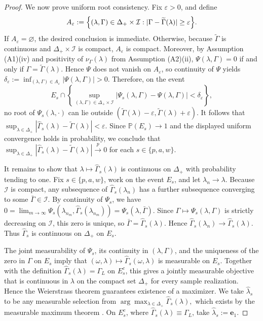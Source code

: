 \documentclass[12pt,leqno,titlepage]{amsart}
\newcommand{\1}{\mathbbm{1}}
\begin{document}
\begin{bibunit}
{\begin{proof}
We now prove uniform root consistency. Fix \(\varepsilon>0\), and define
\[
A_\varepsilon
:=
\Bigl\{
(\lambda,\Gamma)\in\Delta_+\times\mathcal I:
|\Gamma-\widetilde\Gamma(\lambda)|\ge \varepsilon
\Bigr\}.
\]
If \(A_\varepsilon=\varnothing\), the desired conclusion is immediate. Otherwise, because \(\widetilde\Gamma\) is continuous and \(\Delta_+\times\mathcal I\) is compact, \(A_\varepsilon\) is compact. Moreover, by Assumption \textup{(A1)(iv)} and positivity of \(\nu_\Gamma(\lambda)\) from Assumption \textup{(A2)(ii)},
$
\Psi(\lambda,\Gamma)=0
$ if and only if $
\Gamma=\widetilde\Gamma(\lambda).
$
Hence \(\Psi\) does not vanish on \(A_\varepsilon\), so continuity of \(\Psi\) yields
$
\delta_\varepsilon
:=
\inf_{(\lambda,\Gamma)\in A_\varepsilon}|\Psi(\lambda,\Gamma)|
>0.
$
Therefore, on the event
\[
E_s
\cap
\left\{
\sup_{(\lambda,\Gamma)\in\Delta_+\times\mathcal I}
|\Psi_s(\lambda,\Gamma)-\Psi(\lambda,\Gamma)|
<
\delta_\varepsilon
\right\},
\]
no root of \(\Psi_s(\lambda,\cdot)\) can lie outside
$
(\widetilde\Gamma(\lambda)-\varepsilon,\widetilde\Gamma(\lambda)+\varepsilon).
$
It follows that
$
\sup_{\lambda\in\Delta_+}
|\widehat\Gamma_s(\lambda)-\widetilde\Gamma(\lambda)|
<\varepsilon.
$
Since \(\mathbb P(E_s)\to1\) and the displayed uniform convergence holds in probability, we conclude that
$
\sup_{\lambda\in\Delta_+}
|\widehat\Gamma_s(\lambda)-\widetilde\Gamma(\lambda)|
\xrightarrow{p}0$ for each $s \in\{p,a,w\}.
$

It remains to show that \(\lambda\mapsto\widehat\Gamma_s(\lambda)\) is continuous on \(\Delta_+\) with probability tending to one. Fix \(s\in\{p,a,w\}\), work on the event $E_s$, and let \(\lambda_n\to\lambda\). Because \(\mathcal I\) is compact, any subsequence of \(\widehat\Gamma_s(\lambda_n)\) has a further subsequence converging to some \(\bar\Gamma\in\mathcal I\). By continuity of \(\Psi_s\), we have
$
0
=
\lim_{m\to\infty}
\Psi_s(\lambda_{n_m},\widehat\Gamma_s(\lambda_{n_m}))
=
\Psi_s(\lambda,\bar\Gamma).
$
Since \(\Gamma\mapsto\Psi_s(\lambda,\Gamma)\) is strictly decreasing on \(\mathcal I\), this zero is unique, so \(\bar\Gamma=\widehat\Gamma_s(\lambda)\). Hence \(\widehat\Gamma_s(\lambda_n)\to\widehat\Gamma_s(\lambda)\). Thus \(\widehat\Gamma_s\) is continuous on \(\Delta_+\) on \(E_s\).

The joint measurability of \(\Psi_s\), its continuity in \((\lambda,\Gamma)\), and the uniqueness of the zero in \(\Gamma\) on \(E_s\) imply that
$
(\omega,\lambda)\mapsto \widehat\Gamma_s(\omega,\lambda)
$
is measurable on \(E_s\). Together with the definition \(\widehat\Gamma_s(\lambda)=\Gamma_L\) on \(E_s^c\), this gives a jointly measurable objective that is continuous in \(\lambda\) on the compact set \(\Delta_+\) for every sample realization. Hence the Weierstrass theorem guarantees existence of a maximizer. We take \(\widehat\lambda_s\) to be any measurable selection from
$
\arg\max_{\lambda\in\Delta_+}\widehat\Gamma_s(\lambda),
$
which exists by the measurable maximum theorem \citep[Theorem~18.19]{aliprantis2006infinite}. On \(E_s^c\), where \(\widehat\Gamma_s(\lambda)\equiv \Gamma_L\), take \(\widehat\lambda_s:=\mathbf e_1\).


\end{proof}}
\end{bibunit}
\end{document}
